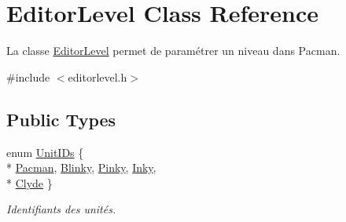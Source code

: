 \hypertarget{class_editor_level}{}\section{Editor\+Level Class Reference}
\label{class_editor_level}


La classe \hyperlink{class_editor_level}{Editor\+Level} permet de paramétrer un niveau dans Pacman.  




{\ttfamily \#include $<$editorlevel.\+h$>$}

\subsection*{Public Types}
\begin{DoxyCompactItemize}
\item 
enum \hyperlink{class_editor_level_adf05726a383094d778d951c075bceb59}{Unit\+I\+Ds} \{ \\*
\hyperlink{class_editor_level_adf05726a383094d778d951c075bceb59a953d321d77018b2117fcb084de1c3136}{Pacman}, 
\hyperlink{class_editor_level_adf05726a383094d778d951c075bceb59acd032aeb95f0a518d8495108838a8edb}{Blinky}, 
\hyperlink{class_editor_level_adf05726a383094d778d951c075bceb59aad79d7ec47fb4acc41928dae8597de12}{Pinky}, 
\hyperlink{class_editor_level_adf05726a383094d778d951c075bceb59a43e8ae5b35772e1223b6b9097c10e477}{Inky}, 
\\*
\hyperlink{class_editor_level_adf05726a383094d778d951c075bceb59abf16acba9b6d575e6426e2609e92bf78}{Clyde}
 \}\begin{DoxyCompactList}\small\item\em Identifiants des unités. \end{DoxyCompactList}
\end{DoxyCompactItemize}
